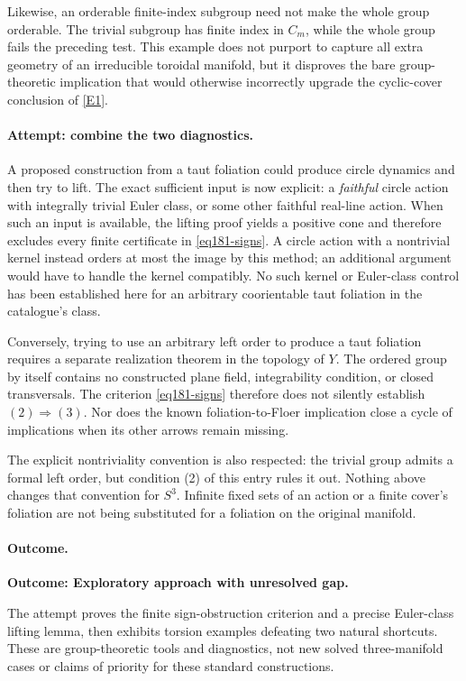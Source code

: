 \documentclass[11pt,a4paper]{article}
\newcommand{\eref}[2]{\hyperlink{extra:#1:#2}{[E#2]}}
\numberwithin{equation}{section}
\begin{document}
Likewise, an orderable finite-index subgroup need not make the whole group
orderable. The trivial subgroup has finite index in $C_m$, while the whole
group fails the preceding test. This example does not purport to capture
all extra geometry of an irreducible toroidal manifold, but it disproves
the bare group-theoretic implication that would otherwise incorrectly
upgrade the cyclic-cover conclusion of \eref{30006775}{1}.

\paragraph{Attempt: combine the two diagnostics.}
A proposed construction from a taut foliation could produce circle dynamics
and then try to lift. The exact sufficient input is now explicit: a
\emph{faithful} circle action with integrally trivial Euler class, or some
other faithful real-line action. When such an input is available, the
lifting proof yields a positive cone and therefore excludes every finite
certificate in \eqref{eq181-signs}. A circle action with a nontrivial kernel
instead orders at most the image by this method; an additional argument
would have to handle the kernel compatibly. No such kernel or Euler-class
control has been established here for an arbitrary coorientable taut
foliation in the catalogue's class.

Conversely, trying to use an arbitrary left order to produce a taut
foliation requires a separate realization theorem in the topology of $Y$.
The ordered group by itself contains no constructed plane field,
integrability condition, or closed transversals. The criterion
\eqref{eq181-signs} therefore does not silently establish
$(2)\Rightarrow(3)$. Nor does the known foliation-to-Floer implication
close a cycle of implications when its other arrows remain missing.

The explicit nontriviality convention is also respected: the trivial group
admits a formal left order, but condition (2) of this entry rules it out.
Nothing above changes that convention for $S^3$. Infinite fixed sets of
an action or a finite cover's foliation are not being substituted for a
foliation on the original manifold.

\paragraph{Outcome.}
\textbf{Outcome: Exploratory approach with unresolved gap.}

The attempt proves the finite sign-obstruction criterion and a precise
Euler-class lifting lemma, then exhibits torsion examples defeating two
natural shortcuts. These are group-theoretic tools and diagnostics, not
new solved three-manifold cases or claims of priority for these standard
constructions.
\end{document}
